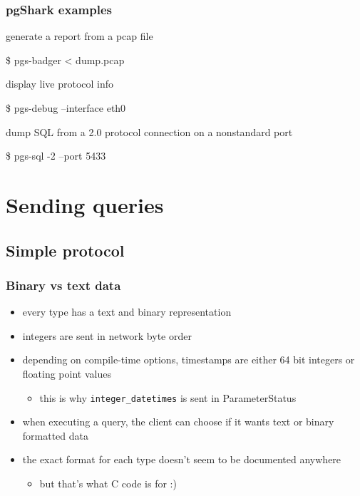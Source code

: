 \documentclass{beamer}
\begin{document}
\begin{frame}[fragile]
  \frametitle{pgShark examples}

  \begin{block}{generate a report from a pcap file}
    \begin{semiverbatim}
    \$ pgs-badger < dump.pcap
    \end{semiverbatim}
  \end{block}

  \begin{block}{display live protocol info}
    \begin{semiverbatim}
    \$ pgs-debug --interface eth0
    \end{semiverbatim}
  \end{block}

  \begin{block}{dump SQL from a 2.0 protocol connection on a nonstandard port}
    \begin{semiverbatim}
    \$ pgs-sql -2 --port 5433
    \end{semiverbatim}
  \end{block}
\end{frame}

\section{Sending queries}
\subsection{Simple protocol}

\begin{frame}
  \frametitle{Binary vs text data}

  \begin{itemize}
  \item every type has a text and binary representation
  \item integers are sent in network byte order
  \item depending on compile-time options, timestamps are either 64 bit
    integers or floating point values
    \begin{itemize}
    \item this is why \texttt{integer\_datetimes} is sent in ParameterStatus
    \end{itemize}
  \item when executing a query, the client can choose if it wants text or
    binary formatted data
  \item the exact format for each type doesn't seem to be documented anywhere
    \begin{itemize}
    \item but that's what C code is for :)
    \end{itemize}
  \end{itemize}
\end{frame}
\end{document}
